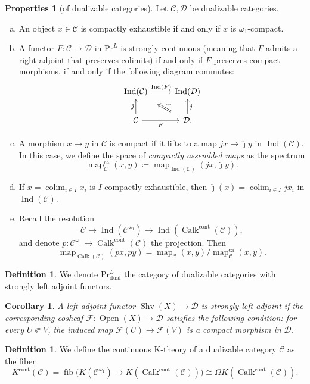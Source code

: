 \documentclass[draft]{amsart}
\newcommand{\jhat}{\hat\jmath}
\newcommand{\cat}[1]{\mathcal{#1}}
\newcommand{\sheaf}[1]{\mathcal{#1}}
\newcommand{\ssubset}{\Subset}
\renewcommand{\Pr}{\mathrm{Pr}}
\DeclareMathOperator{\fib}{fib}
\DeclareMathOperator{\Ind}{Ind}
\DeclareMathOperator{\Open}{Open}
\DeclareMathOperator{\map}{map}
\DeclareMathOperator{\Shv}{Shv}
\DeclareMathOperator{\Calk}{Calk}
\DeclareMathOperator*{\colim}{colim}
\newtheorem{cor}[thm]{Corollary}
\theoremstyle{definition}
\newtheorem{defn}[thm]{Definition}
\newtheorem{properties}[thm]{Properties}
\begin{document}
\begin{properties}[of dualizable categories]
Let $\cat C, \cat D$ be dualizable categories.
\begin{enumerate}[(a)]
\item An object $x\in \cat C$ is compactly exhaustible if and only if $x$ is $\omega_1$-compact.

\item A functor $F\colon \cat C\to \cat D$ in $\Pr^L$ is strongly continuous (meaning that $F$ admits a right adjoint that preserves colimits) if and only if $F$ preserves compact morphisms, if and only if the following diagram commutes:
\[
\begin{tikzcd}
\Ind(\cat C) \ar[r,"\Ind(F)"] & \Ind(\cat D) \\
\cat C \ar[u,"\jhat"] \ar[r,"F"'] & \cat D \ar[ul,Rightarrow,shorten=4mm, "\sim"'] \ar[u,"\jhat"'].
\end{tikzcd}
\]

\item A morphism $x\to y$ in $\cat C$ is compact if it lifts to a map $jx \to \jhat y$ in $\Ind(\cat C)$. In this case, we define the space of \emph{compactly assembled maps} as the spectrum
\[
\map_{\cat C}^{\mathrm{ca}}(x,y)\coloneqq \map_{\Ind(\cat C)}(jx, \jhat y).
\]

\item If $x = \colim_{i\in I} x_i$ is $I$-compactly exhaustible, then $\jhat(x) = \colim_{i\in I} jx_i$ in $\Ind(\cat C)$.

\item Recall the resolution 
\[
\cat C \to \Ind(\cat C^{\omega_1}) \to \Ind(\Calk^{\mathrm{cont}}(\cat C)),
\]
and denote $p\colon \cat C^{\omega_1} \to \Calk^{\mathrm{cont}}(\cat C)$ the projection. Then
\[
\map_{\Calk(\cat C)}(px, py) = \map_{\cat C}(x,y) / \map_{\cat C}^{\mathrm{ca}} (x,y).
\]
\end{enumerate}
\end{properties}

\begin{defn}
We denote $\Pr^L_{\mathrm{dual}}$ the category of dualizable categories with strongly left adjoint functors.
\end{defn}

\begin{cor}
A left adjoint functor $\Shv(X) \to \cat D$ is strongly left adjoint if the corresponding cosheaf $\sheaf F\colon \Open(X) \to \cat D$ satisfies the following condition: for every $U\ssubset V$, the induced map $\sheaf F(U) \to \sheaf F(V)$ is a compact morphism in $\cat D$.
\end{cor}

\begin{defn}
We define the continuous K-theory of a dualizable category $\cat C$ as the fiber
\[
K^{\mathrm{cont}}(\cat C) = \fib\bigl(K(\cat C^{\omega_1}) \to K(\Calk^{\mathrm{cont}}(\cat C))\bigr) \cong \Omega K(\Calk^{\mathrm{cont}}(\cat C)).
\]
\end{defn}
\end{document}
